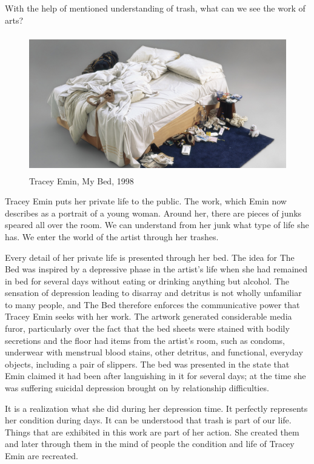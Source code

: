  With the help of mentioned understanding of trash, what can we see the work of arts?

\begin{figure}[h!]
  \centering
  \includegraphics[height=6cm]{graphics/tracey-emin-my-bed.jpg}
  \caption{Tracey Emin, My Bed, 1998}
  \label{fig:TraceyEmin_MyBed}
\end{figure}

Tracey Emin puts her private life to the public. The work, which Emin now describes as a portrait of a young woman. Around her, there are pieces of junks speared all over the room. We can understand from her junk what type of life she has. We enter the world of the artist through her trashes.

Every detail of her private life is presented through her bed. The idea for The Bed was inspired by a depressive phase in the artist’s life when she had remained in bed for several days without eating or drinking anything but alcohol. The sensation of depression leading to disarray and detritus is not wholly unfamiliar to many people, and The Bed therefore enforces the communicative power that Tracey Emin seeks with her work. The artwork generated considerable media furor, particularly over the fact that the bed sheets were stained with bodily secretions and the floor had items from the artist's room, such as condoms, underwear with menstrual blood stains, other detritus, and functional, everyday objects, including a pair of slippers. The bed was presented in the state that Emin claimed it had been after languishing in it for several days; at the time she was suffering suicidal depression brought on by relationship difficulties.

It is a realization what she did during her depression time. It perfectly represents her condition during days. It can be understood that trash is part of our life. Things that are exhibited in this work are part of her action. She created them and later through them in the mind of people the condition and life of Tracey Emin are recreated. 

